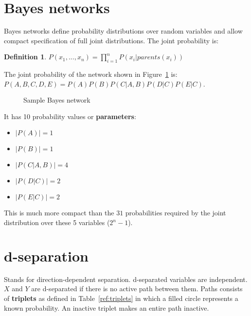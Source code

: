 \documentclass{report}
\newtheorem{definition}{Definition}[section]
\begin{document}
\section{Bayes networks}
Bayes networks define probability distributions over random variables and allow compact specification of full joint distributions. The joint probability is:
\begin{definition}
$P(x_1,...,x_n) = \prod_{i=1}^{n}{P(x_i\vert parents(x_i))}$
\end{definition}


The joint probability of the network shown in Figure~\ref{ref:samplenetwork} is: $P(A,B,C,D,E)=P(A)P(B)P(C\vert A,B)P(D\vert C)P(E\vert C)$.

\begin{figure}[h!]
\centering
{}
\caption{Sample Bayes network}
\label{ref:samplenetwork}
\end{figure}

It has 10 probability values or {\bf parameters}:
\begin{itemize}
\item $\vert P(A)\vert = 1$
\item $\vert P(B)\vert = 1$
\item $\vert P(C\vert A,B)\vert = 4$
\item $\vert P(D\vert C)\vert = 2$
\item $\vert P(E\vert C)\vert = 2$
\end{itemize}

This is much more compact than the $31$ probabilities required by the joint distribution over these 5 variables ($2^n - 1$).


\section{d-separation}
Stands for direction-dependent separation. d-separated variables are independent. $X$ and $Y$ are d-separated if there is no active path between them.
Paths consists of {\bf triplets} as defined in Table~\ref{ref:triplets} in which a filled circle represents a known probability. An inactive triplet makes an entire path inactive. \\
\end{document}
